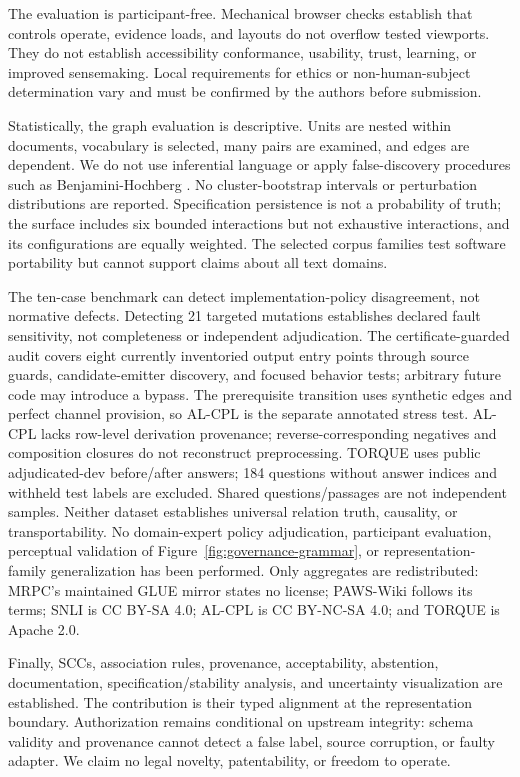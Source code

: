 \documentclass[manuscript,screen,review,anonymous]{acmart}
\begin{document}
The evaluation is participant-free. Mechanical browser checks establish that controls operate, evidence loads, and layouts do not overflow tested viewports. They do not establish accessibility conformance, usability, trust, learning, or improved sensemaking. Local requirements for ethics or non-human-subject determination vary and must be confirmed by the authors before submission.

Statistically, the graph evaluation is descriptive. Units are nested within documents, vocabulary is selected, many pairs are examined, and edges are dependent. We do not use inferential language or apply false-discovery procedures such as Benjamini-Hochberg \cite{benjamini1995}. No cluster-bootstrap intervals or perturbation distributions are reported. Specification persistence is not a probability of truth; the surface includes six bounded interactions but not exhaustive interactions, and its configurations are equally weighted. The selected corpus families test software portability but cannot support claims about all text domains.

The ten-case benchmark can detect implementation-policy disagreement, not normative defects. Detecting 21 targeted mutations establishes declared fault sensitivity, not completeness or independent adjudication. The certificate-guarded audit covers eight currently inventoried output entry points through source guards, candidate-emitter discovery, and focused behavior tests; arbitrary future code may introduce a bypass. The prerequisite transition uses synthetic edges and perfect channel provision, so AL-CPL is the separate annotated stress test. AL-CPL lacks row-level derivation provenance; reverse-corresponding negatives and composition closures do not reconstruct preprocessing. TORQUE uses public adjudicated-dev before/after answers; 184 questions without answer indices and withheld test labels are excluded. Shared questions/passages are not independent samples. Neither dataset establishes universal relation truth, causality, or transportability. No domain-expert policy adjudication, participant evaluation, perceptual validation of Figure~\ref{fig:governance-grammar}, or representation-family generalization has been performed. Only aggregates are redistributed: MRPC's maintained GLUE mirror states no license; PAWS-Wiki follows its terms; SNLI is CC BY-SA 4.0; AL-CPL is CC BY-NC-SA 4.0; and TORQUE is Apache 2.0.

Finally, SCCs, association rules, provenance, acceptability, abstention, documentation, specification/stability analysis, and uncertainty visualization are established. The contribution is their typed alignment at the representation boundary. Authorization remains conditional on upstream integrity: schema validity and provenance cannot detect a false label, source corruption, or faulty adapter. We claim no legal novelty, patentability, or freedom to operate.
\end{document}
